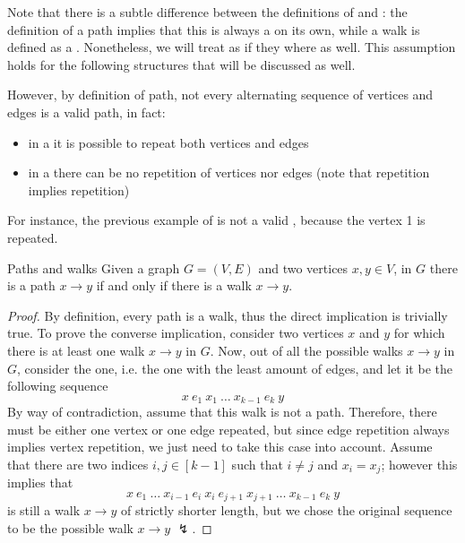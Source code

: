 \documentclass[a4paper, 12pt]{report}
\begin{document}
    Note that there is a subtle difference between the definitions of  and : the definition of a path implies that this is always a  on its own, while a walk is defined as a . Nonetheless, we will treat  as if they where  as well. This assumption holds for the following structures that will be discussed as well.

    However, by definition of path, not every alternating sequence of vertices and edges is a valid path, in fact:
    
    \begin{itemize}
        \item in a  it is possible to repeat both vertices and edges
        \item in a  there can be no repetition of vertices nor edges (note that  repetition implies  repetition)
    \end{itemize}

    For instance, the previous example of  is not a valid , because the vertex 1 is repeated.

    \begin{framedthm}[label={paths and walks}]{Paths and walks}
        Given a graph $G = (V, E)$ and two vertices $x, y \in V$, in $G$ there is a path $x \to y$ if and only if there is a walk $x \to y$.
    \end{framedthm}

    \begin{proof}
        By definition, every path is a walk, thus the direct implication is trivially true. To prove the converse implication, consider two vertices $x$ and $y$ for which there is at least one walk $x \to y$ in $G$. Now, out of all the possible walks $x \to y$ in $G$, consider the  one, i.e. the one with the least amount of edges, and let it be the following sequence $$x \ e_1 \ x_1 \ \ldots \ x_{k - 1} \ e_k \ y $$ By way of contradiction, assume that this walk is not a path. Therefore, there must be either one vertex or one edge repeated, but since edge repetition always implies vertex repetition, we just need to take this case into account. Assume that there are two indices $i, j \in [k - 1]$ such that $i \neq j$ and $x_i = x_j$; however this implies that $$x \ e_1 \ \ldots \ x_{i - 1} \ e_i \ x_i \ e_{j + 1} \ x_{j + 1} \ \ldots \ x_{k - 1} \ e_k \ y$$ is still a walk $x \to y$ of strictly shorter length, but we chose the original sequence to be the  possible walk $x \to y$ $\lightning$.
    \end{proof}
\end{document}
